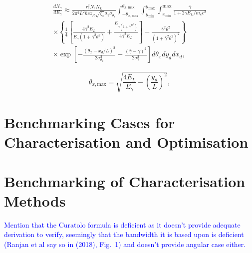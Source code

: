 \documentclass[../main.tex]{subfiles}
\begin{document}
\begin{multline}
\frac{dN_{\gamma}}{dE_{\gamma}} \approx \frac{r_{e}^{2}N_{e}N_{L}}{2\pi^{2}L^{2}\hbar c z_{R}\sqrt{\zeta_{x}}\sigma_{\gamma}\sigma_{\theta_{x}}}\int_{-\theta_{x,\mathrm{max}}}^{\theta_{x,\mathrm{max}}}\int_{y_{\mathrm{min}}}^{y_{\mathrm{max}}}\int_{x_{\mathrm{min}}}^{\mathrm{max}}\frac{\bar{\gamma}}{1+2\gamma E_{L}/m_{e}c^{2}} \\
\times\left\{\frac{1}{4}\left[\frac{4\bar{\gamma}^{2}E_{L}}{E_{\gamma}\left(1+\bar{\gamma}^{2}\theta^{2}\right)}+\frac{E_{\gamma\left(1+\bar{\gamma}^{2\theta^{2}}\right)}}{4\bar{\gamma}^{2}E_{L}}\right]-\frac{\bar{\gamma}^{2}\theta^{2}}{\left(1+\bar{\gamma}^{2}\theta^{2}\right)^{2}}\right\} \\
\times\exp{\left[-\frac{\left(\theta_{x}-x_{d}/L\right)^{2}}{2\sigma_{\theta_{x}}^{2}}-\frac{\left(\bar{\gamma}-\gamma\right)^{2}}{2\sigma_{\gamma}^{2}}\right]}d\theta_{x}dy_{d}dx_{d},
\label{eq:1D_sun_equation}    
\end{multline}
    
\begin{equation}
\theta_{x,\mathrm{max}} = \sqrt{\frac{4E_{L}}{E_{\gamma}}-\left(\frac{y_{d}}{L}\right)^{2}},
\label{eq:theta_max_parameter_1D_sun}
\end{equation}

\section{Benchmarking Cases for Characterisation and Optimisation}
\label{sec:benchmarking_cases_characterisation_optimisation}

\section{Benchmarking of Characterisation Methods}
\label{sec:benchmarking_of_the_ICARUS_spectrum_code}

\textcolor{blue}{Mention that the Curatolo formula is deficient as it doesn't provide adequate derivation to verify, seemingly that the bandwidth it is based upon is deficient (Ranjan et al say so in (2018), Fig.~1) and doesn't provide angular case either.}
\end{document}
